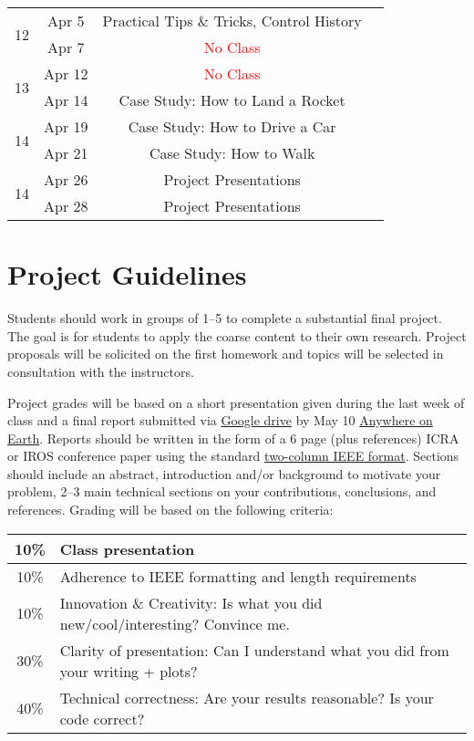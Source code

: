 \documentclass[11pt,letterpaper]{article}
\begin{document}
\begin{tabular}{c|c|c|c}
	 \hline
	\multirow{2}{*}{12}  & Apr 5 & Practical Tips \& Tricks, Control History &   \\
	 & Apr 7 & \textcolor{red}{No Class} &   \\
	 \hline
	\multirow{2}{*}{13}  & Apr 12 & \textcolor{red}{No Class} &  \\
	 & Apr 14 & Case Study: How to Land a Rocket &   \\
	 \hline
	\multirow{2}{*}{14}  & Apr 19 & Case Study: How to Drive a Car &  \\
	 & Apr 21 & Case Study: How to Walk &   \\
	 \hline
	\multirow{2}{*}{14}  & Apr 26 & Project Presentations &  \\
	 & Apr 28 & Project Presentations &   \\
\end{tabular}

\clearpage

\section*{Project Guidelines}

Students should work in groups of 1--5 to complete a substantial final project. The goal is for students to apply the coarse content to their own research. Project proposals will be solicited on the first homework and topics will be selected in consultation with the instructors.

\medskip
\noindent
Project grades will be based on a short presentation given during the last week of class and a final report submitted via \href{https://forms.gle/j1xhW13DuvcYLf6j7}{Google drive} by May 10 \href{https://time.is/Anywhere_on_Earth}{Anywhere on Earth}. Reports should be written in the form of a 6 page (plus references) ICRA or IROS conference paper using the standard \href{https://www.ieee.org/conferences/publishing/templates.html}{two-column IEEE format}. Sections should include an abstract, introduction and/or background to motivate your problem, 2--3 main technical sections on your contributions, conclusions, and references. Grading will be based on the following criteria:
\newline
\newline
\begin{tabular}{|c|l|}
\hline
10\% & Class presentation \\
\hline
10\% & Adherence to IEEE formatting and length requirements \\
\hline
10\% & Innovation \& Creativity: Is what you did new/cool/interesting? Convince me. \\
\hline
30\% & Clarity of presentation: Can I understand what you did from your writing + plots? \\
\hline
40\% & Technical correctness: Are your results reasonable? Is your code correct? \\
\hline	
\end{tabular}
\end{document}
